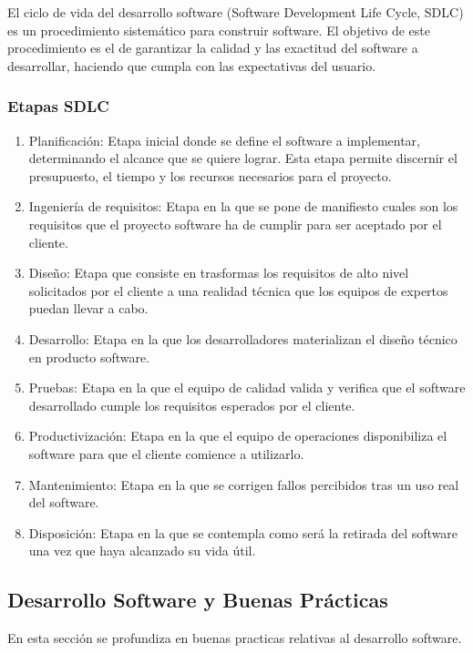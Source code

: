 \documentclass[a4paper,11pt]{book}
\begin{document}
El ciclo de vida del desarrollo software (Software Development Life Cycle, SDLC) es un procedimiento sistemático para construir software.  El objetivo de este procedimiento es el de garantizar la calidad y las exactitud del software a desarrollar, haciendo que cumpla con las expectativas del usuario. 
   
\subsubsection{Etapas SDLC}

\begin{enumerate}
\item  Planificación: Etapa inicial donde se define el software a implementar, determinando el alcance que se quiere lograr. Esta etapa permite discernir el presupuesto, el tiempo y los recursos necesarios para el proyecto. 
\item Ingeniería de requisitos: Etapa en la que se pone de manifiesto cuales son los requisitos que el proyecto software ha de cumplir para ser aceptado por el cliente. 
\item Diseño: Etapa que consiste en trasformas los requisitos de alto nivel solicitados por el cliente a una realidad técnica que los equipos de expertos puedan llevar a cabo. 
\item Desarrollo: Etapa en la que los desarrolladores materializan el diseño técnico en producto software. 
\item Pruebas: Etapa en la que el equipo de calidad valida y verifica que el software desarrollado cumple los requisitos esperados por el cliente. 
\item Productivización:  Etapa en la que el equipo de operaciones disponibiliza el software para que el cliente comience a utilizarlo.
\item Mantenimiento: Etapa en la que se corrigen fallos percibidos tras un uso real del software. 
\item Disposición: Etapa en la que se contempla como será la retirada del software una vez que haya alcanzado su vida útil. 
\end{enumerate}

\subsection{Desarrollo Software y Buenas Prácticas }

En esta sección se profundiza en buenas practicas relativas al desarrollo software.
\end{document}
